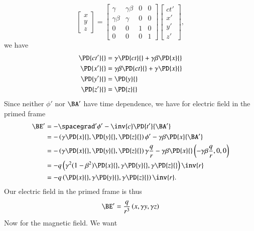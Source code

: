 {\begin{equation}
\begin{bmatrix}
x \\
y \\
z
\end{bmatrix}
=
\begin{bmatrix}
\gamma & \gamma \beta & 0 & 0 \\
\gamma \beta & \gamma & 0 & 0 \\
0 & 0 & 1 & 0 \\
0 & 0 & 0 & 1
\end{bmatrix}
\begin{bmatrix}
ct' \\
x' \\
y' \\
z'
\end{bmatrix},
\end{equation}
we have
\begin{equation}\label{eqn:relElectroDynProblemSet2:1050}
\begin{aligned}
\PD{c t'}{} &= \gamma \PD{ct}{} + \gamma \beta \PD{x}{} \\
\PD{x'}{} &= \gamma \beta \PD{ct}{} + \gamma \PD{x}{} \\
\PD{y'}{} &= \PD{y}{} \\
\PD{z'}{} &= \PD{z}{}
\end{aligned}
\end{equation}
%
Since neither \(\phi'\) nor \(\BA'\) have time dependence, we have for electric field in the primed frame
%
\begin{equation}\label{eqn:relElectroDynProblemSet2:1250}
\begin{aligned}
\BE'
&= -\spacegrad' \phi' - \inv{c} \PD{t'}{\BA'} \\
&=
-\left( \gamma \PD{x}{}, \PD{y}{}, \PD{z}{} \right) \phi'
- \gamma \beta \PD{x}{\BA'} \\
&=
-\left( \gamma \PD{x}{}, \PD{y}{}, \PD{z}{} \right) \gamma \frac{q}{r}
- \gamma \beta \PD{x}{} \left( -\gamma \beta \frac{q}{r}, 0, 0 \right) \\
&= -q \left( \gamma^2 ( 1 - \beta^2 ) \PD{x}{}, \gamma \PD{y}{}, \gamma \PD{z}{} \right) \inv{r} \\
&= -q \left( \PD{x}{}, \gamma \PD{y}{}, \gamma \PD{z}{} \right) \inv{r}.
\end{aligned}
\end{equation}
Our electric field in the primed frame is thus
\begin{equation}\label{eqn:relElectroDynProblemSet2:1070}
\BE' = \frac{q}{r^3} \left( x, \gamma y, \gamma z \right)
\end{equation}
%
Now for the magnetic field.  We want
}
